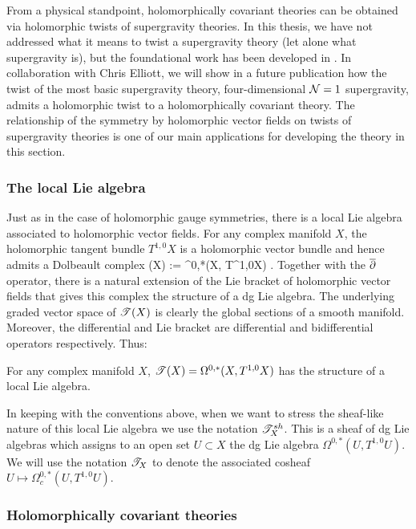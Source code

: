 From a physical standpoint, holomorphically covariant theories can be obtained via holomorphic twists of supergravity theories.
In this thesis, we have not addressed what it means to twist a supergravity theory (let alone what supergravity is), but the foundational work has been developed in \cite{CostelloLiSUGRA}. 
In collaboration with Chris Elliott, we will show in a future publication how the twist of the most basic supergravity theory, four-dimensional $\mathcal N = 1$ supergravity, admits a holomorphic twist to a holomorphically covariant theory. 
The relationship of the symmetry by holomorphic vector fields on twists of supergravity theories is one of our main applications for developing the theory in this section.

\subsubsection{The local Lie algebra}

Just as in the case of holomorphic gauge symmetries, there is a local Lie algebra associated to holomorphic vector fields. 
For any complex manifold $X$, the holomorphic tangent bundle $T^{1,0}X$ is a holomorphic vector bundle and hence admits a Dolbeault complex
\ben
\sT(X) := \Omega^{0,*}(X, T^{1,0}X) .
\een
Together with the $\overline{\partial}$ operator, there is a natural extension of the Lie bracket of holomorphic vector fields that gives this complex the structure of a dg Lie algebra.
The underlying graded vector space of $\mathscr T(X)$ is clearly the global sections of a smooth manifold.
Moreover, the differential and Lie bracket are differential and bidifferential operators respectively. 
Thus:

\begin{lem} 
For any complex manifold $X$, $\mathscr T(X) = \Omega^{0,*}(X, T^{1,0}X)$ has the structure of a local Lie algebra.
\end{lem}

In keeping with the conventions above, when we want to stress the sheaf-like nature of this local Lie algebra we use the notation $\mathscr T^{sh}_X$. 
This is a sheaf of dg Lie algebras which assigns to an open set $U \subset X$ the dg Lie algebra $\Omega^{0,*}(U, T^{1,0}U)$. 
We will use the notation $\mathscr T_X$ to denote the associated cosheaf $U \mapsto \Omega^{0,*}_c(U, T^{1,0}U)$.

\subsubsection{Holomorphically covariant theories}

